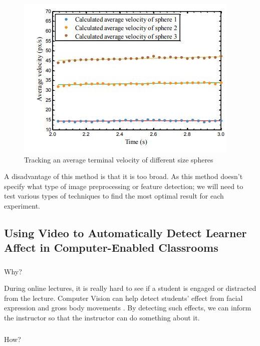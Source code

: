 \documentclass[conference]{IEEEtran}
\begin{document}
\begin{figure}[htbp]
\includegraphics[width=\columnwidth]{Fig3.JPG}
\caption{Tracking an average terminal velocity of different size spheres}
\label{Test2}
\end{figure}

A disadvantage of this method is that it is too broad. As this method doesn’t specify what type of image preprocessing or feature detection; we will need to test various types of techniques to find the most optimal result for each experiment.


\subsection{Using Video to Automatically Detect Learner Affect in Computer-Enabled Classrooms}

\subsubsection{}Why?

During online lectures, it is really hard to see if a student is engaged or distracted from the lecture. Computer Vision can help detect students' effect from facial expression and gross body movements \cite{b14}. By detecting such effects, we can inform the instructor so that the instructor can do something about it.

\subsubsection{}How? 
\end{document}
